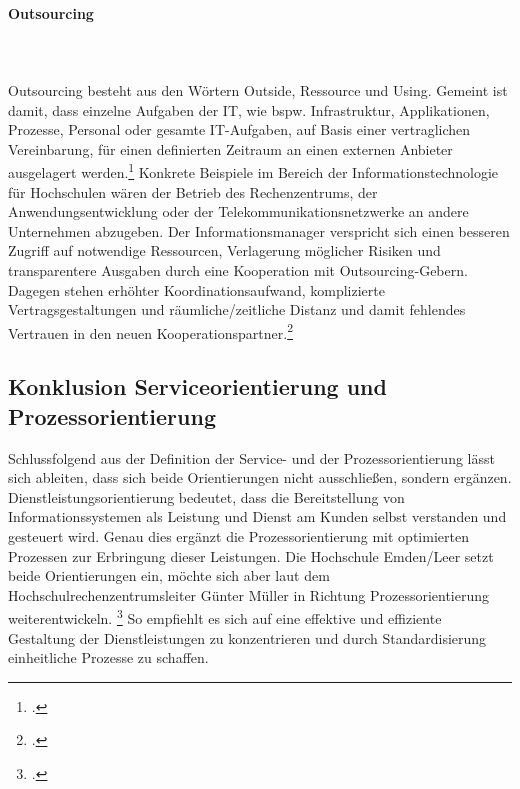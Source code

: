 \paragraph{Outsourcing}\mbox{}\\\\
\label{paragraph_outsourcing}
Outsourcing besteht aus den Wörtern \glqq Outside\grqq{}, \glqq Ressource\grqq{} und \glqq Using\grqq{}. Gemeint ist damit, dass einzelne Aufgaben der IT, wie bspw. Infrastruktur, Applikationen, Prozesse, Personal oder gesamte IT-Aufgaben, auf Basis einer vertraglichen Vereinbarung, für einen definierten Zeitraum an einen externen Anbieter ausgelagert werden.\footcite[Vgl.][164]{krcmar_einfuhrung_2015} Konkrete Beispiele im Bereich der Informationstechnologie für Hochschulen wären der Betrieb des Rechenzentrums, der Anwendungsentwicklung oder der Telekommunikationsnetzwerke an andere Unternehmen abzugeben. Der Informationsmanager verspricht sich einen besseren Zugriff auf notwendige Ressourcen, Verlagerung möglicher Risiken und transparentere Ausgaben durch eine Kooperation mit Outsourcing-Gebern. Dagegen stehen erhöhter Koordinationsaufwand, komplizierte Vertragsgestaltungen und räumliche/zeitliche Distanz und damit fehlendes Vertrauen in den neuen Kooperationspartner.\footcite[Vgl.][195 ff.]{barthelemy_2001}

\subsection{Konklusion Serviceorientierung und Prozessorientierung}
Schlussfolgend aus der Definition der Service- und der Prozessorientierung lässt sich ableiten, dass sich beide Orientierungen nicht ausschließen, sondern ergänzen.  Dienstleistungsorientierung bedeutet, dass die Bereitstellung von Informationssystemen als Leistung und Dienst am Kunden selbst verstanden und gesteuert wird. Genau dies ergänzt die Prozessorientierung mit optimierten Prozessen zur Erbringung dieser Leistungen. 
Die Hochschule Emden/Leer setzt beide Orientierungen ein, möchte sich aber laut dem Hochschulrechenzentrumsleiter Günter Müller in Richtung Prozessorientierung weiterentwickeln. \footcite{gunter_muller_interview} So empfiehlt es sich auf eine effektive und effiziente Gestaltung der Dienstleistungen zu konzentrieren und durch Standardisierung einheitliche Prozesse zu schaffen.
